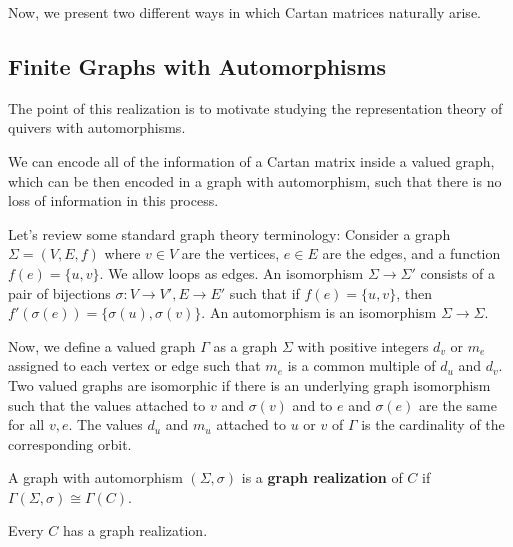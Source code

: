 Now, we present two different ways in which Cartan matrices naturally arise.

\subsection{Finite Graphs with Automorphisms}

The point of this realization is to motivate studying the representation theory of quivers with automorphisms.

We can encode all of the information of a Cartan matrix inside a valued graph, which can be then encoded in a graph with automorphism, such that there is no loss of information in this process.

Let's review some standard graph theory terminology: Consider a graph $\Sigma=(V,E,f)$ where $v\in V$ are the vertices, $e\in E$ are the edges, and a function $f(e)=\{u,v\}$. We allow loops as edges. An isomorphism $\Sigma\to \Sigma'$ consists of a pair of bijections $\sigma: V\to V', E\to E'$ such that if $f(e)=\{u,v\}$, then $f'(\sigma(e))=\{\sigma(u),\sigma(v)\}$. An automorphism is an isomorphism $\Sigma\to \Sigma$.

Now, we define a valued graph $\Gamma$ as a graph $\Sigma$ with positive integers $d_v$ or $m_e$ assigned to each vertex or edge such that $m_e$ is a common multiple of $d_u$ and $d_v$. Two valued graphs are isomorphic if there is an underlying graph isomorphism such that the values attached to $v$ and $\sigma(v)$ and to $e$ and $\sigma(e)$ are the same for all $v,e$. The values $d_u$ and $m_u$ attached to $u$ or $v$ of $\Gamma$ is the cardinality of the corresponding orbit. 

\begin{definition}
    A graph with automorphism $(\Sigma,\sigma)$ is a \textbf{graph realization} of $C$ if $\Gamma(\Sigma, \sigma ) \cong \Gamma(C)$.
\end{definition}

\begin{theorem}
    Every $C$ has a graph realization.
\end{theorem}

